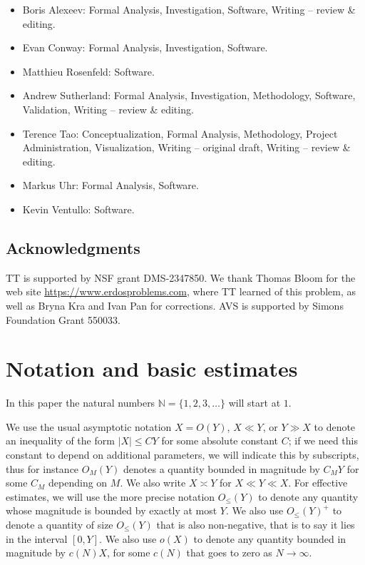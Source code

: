 \documentclass[12pt,a4paper,reqno]{amsart}
\numberwithin{equation}{section}
\theoremstyle{plain}
\theoremstyle{definition}
\newcommand\N{\mathbb{N}}
\begin{document}
\begin{itemize}
\item Boris Alexeev: Formal Analysis, Investigation, Software, Writing -- review \& editing.
\item Evan Conway: Formal Analysis, Investigation, Software.
\item Matthieu Rosenfeld: Software.
\item Andrew Sutherland: Formal Analysis, Investigation, Methodology, Software, Validation, Writing -- review \& editing.
\item Terence Tao: Conceptualization, Formal Analysis, Methodology, Project Administration, Visualization, Writing -- original draft, Writing -- review \& editing.
\item Markus Uhr: Formal Analysis, Software.
\item Kevin Ventullo: Software.
\end{itemize}

\subsection{Acknowledgments}

TT is supported by NSF grant DMS-2347850.  We thank Thomas Bloom for the web site \url{https://www.erdosproblems.com}, where TT learned of this problem, as well as Bryna Kra and Ivan Pan for  corrections. AVS is supported by Simons Foundation Grant 550033.


\section{Notation and basic estimates}

In this paper the natural numbers $\N=\{1,2,3,\dots\}$ will start at $1$.

We use the usual asymptotic notation $X = O(Y)$, $X \ll Y$, or $Y \gg X$ to denote an inequality of the form $|X| \leq CY$ for some absolute constant $C$; if we need this constant to depend on additional parameters, we will indicate this by subscripts, thus for instance $O_M(Y)$ denotes a quantity bounded in magnitude by $C_M Y$ for some $C_M$ depending on $M$.  We also write $X \asymp Y$ for $X \ll Y \ll X$. For effective estimates, we will use the more precise notation $O_{\leq}(Y)$ to denote any quantity whose magnitude is bounded by exactly at most $Y$. We also use $O_{\leq}(Y)^+$ to denote a quantity of size $O_{\leq}(Y)$ that is also non-negative, that is to say it lies in the interval $[0,Y]$.  We also use $o(X)$ to denote any quantity bounded in magnitude by $c(N) X$, for some $c(N)$ that goes to zero as $N \to \infty$.
\end{document}
